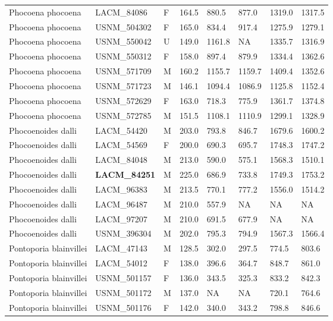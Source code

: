 \begin{longtable}{|p{1.95in}p{1.1in}p{.15in}p{.4in}p{.4in}p{.4in}p{.4in}p{.4in}|}
  Phocoena phocoena & LACM\_84086 & F & 164.5 & 880.5 & 877.0 & 1319.0 & 1317.5 \\ 
  Phocoena phocoena & USNM\_504302 & F & 165.0 & 834.4 & 917.4 & 1275.9 & 1279.1 \\ 
  Phocoena phocoena & USNM\_550042 & U & 149.0 & 1161.8 & NA & 1335.7 & 1316.9 \\ 
  Phocoena phocoena & USNM\_550312 & F & 158.0 & 897.4 & 879.9 & 1334.4 & 1362.6 \\ 
  Phocoena phocoena & USNM\_571709 & M & 160.2 & 1155.7 & 1159.7 & 1409.4 & 1352.6 \\ 
  Phocoena phocoena & USNM\_571723 & M & 146.1 & 1094.4 & 1086.9 & 1125.8 & 1152.4 \\ 
  Phocoena phocoena & USNM\_572629 & F & 163.0 & 718.3 & 775.9 & 1361.7 & 1374.8 \\ 
  Phocoena phocoena & USNM\_572785 & M & 151.5 & 1108.1 & 1110.9 & 1299.1 & 1328.9 \\ 
  Phocoenoides dalli & LACM\_54420 & M & 203.0 & 793.8 & 846.7 & 1679.6 & 1600.2 \\ 
  Phocoenoides dalli & LACM\_54569 & F & 200.0 & 690.3 & 695.7 & 1748.3 & 1747.2 \\ 
  Phocoenoides dalli & LACM\_84048 & M & 213.0 & 590.0 & 575.1 & 1568.3 & 1510.1 \\ 
  Phocoenoides dalli & \textbf{ LACM\_84251 } & M & 225.0 & 686.9 & 733.8 & 1749.3 & 1753.2 \\ 
  Phocoenoides dalli & LACM\_96383 & M & 213.5 & 770.1 & 777.2 & 1556.0 & 1514.2 \\ 
  Phocoenoides dalli & LACM\_96487 & M & 210.0 & 557.9 & NA & NA & NA  \\ 
  Phocoenoides dalli & LACM\_97207 & M & 210.0 & 691.5 & 677.9 & NA &  NA \\ 
  Phocoenoides dalli & USNM\_396304 & M & 202.0 & 795.3 & 794.9 & 1567.3 & 1566.4 \\ 
  Pontoporia blainvillei & LACM\_47143 & M & 128.5 & 302.0 & 297.5 & 774.5 & 803.6 \\ 
  Pontoporia blainvillei & LACM\_54012 & F & 138.0 & 396.6 & 364.7 & 848.7 & 861.0 \\ 
  Pontoporia blainvillei & USNM\_501157 & F & 136.0 & 343.5 & 325.3 & 833.2 & 842.3 \\ 
  Pontoporia blainvillei & USNM\_501172 & M & 137.0 & NA & NA & 720.1 & 764.6 \\ 
  Pontoporia blainvillei & USNM\_501176 & F & 142.0 & 340.0 & 343.2 & 798.8 & 846.6 \\ 

\end{longtable}
